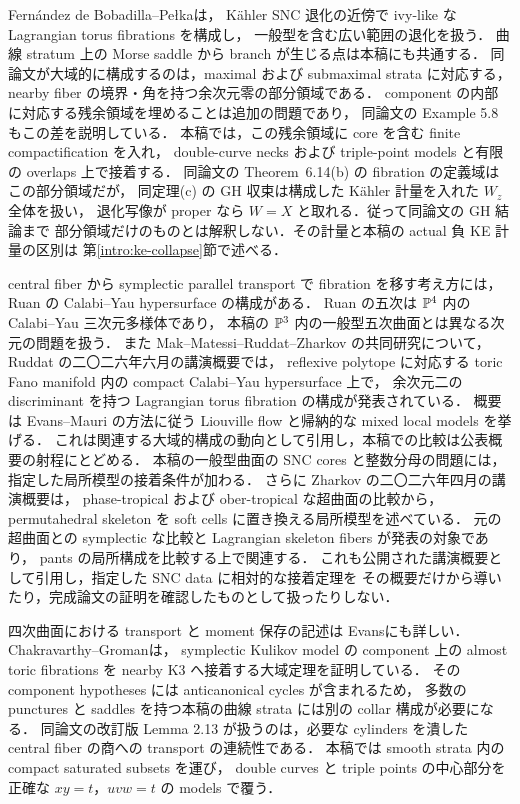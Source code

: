 Fernández de Bobadilla--Pełka\cite[Proposition 5.6, Theorem 6.14]{FBP}は，
Kähler SNC 退化の近傍で ivy-like な Lagrangian torus fibrations を構成し，
一般型を含む広い範囲の退化を扱う．
曲線 stratum 上の Morse saddle から branch が生じる点は本稿にも共通する．
同論文が大域的に構成するのは，maximal および submaximal strata に対応する，
nearby fiber の境界・角を持つ余次元零の部分領域である．
component の内部に対応する残余領域を埋めることは追加の問題であり，
同論文の Example 5.8 もこの差を説明している．
本稿では，この残余領域に core を含む finite compactification を入れ，
double-curve necks および triple-point models と有限の overlaps 上で接着する．
同論文の Theorem~6.14(b) の fibration の定義域はこの部分領域だが，
同定理(c) の GH 収束は構成した Kähler 計量を入れた $W_z$ 全体を扱い，
退化写像が proper なら $W=X$ と取れる．従って同論文の GH 結論まで
部分領域だけのものとは解釈しない．その計量と本稿の actual 負 KE 計量の区別は
第\ref{intro:ke-collapse}節で述べる．

central fiber から symplectic parallel transport で fibration を移す考え方には，
Ruan の Calabi--Yau hypersurface の構成\cite{Ruan}がある．
Ruan の五次は $\mathbb P^4$ 内の Calabi--Yau 三次元多様体であり，
本稿の $\mathbb P^3$ 内の一般型五次曲面とは異なる次元の問題を扱う．
また Mak--Matessi--Ruddat--Zharkov の共同研究について，
Ruddat の二〇二六年六月の講演概要\cite{RuddatAnnouncement2026}では，
reflexive polytope に対応する toric Fano manifold 内の compact Calabi--Yau hypersurface 上で，
余次元二の discriminant を持つ Lagrangian torus fibration の構成が発表されている．
概要は Evans--Mauri の方法に従う Liouville flow と帰納的な mixed local models を挙げる．
これは関連する大域的構成の動向として引用し，本稿での比較は公表概要の射程にとどめる．
本稿の一般型曲面の SNC cores と整数分母の問題には，指定した局所模型の接着条件が加わる．
さらに Zharkov の二〇二六年四月の講演概要\cite{ZharkovSoftCells2026}は，
phase-tropical および ober-tropical な超曲面の比較から，
permutahedral skeleton を soft cells に置き換える局所模型を述べている．
元の超曲面との symplectic な比較と Lagrangian skeleton fibers が発表の対象であり，
pants の局所構成を比較する上で関連する．
これも公開された講演概要として引用し，指定した SNC data に相対的な接着定理を
その概要だけから導いたり，完成論文の証明を確認したものとして扱ったりしない．

四次曲面における transport と moment 保存の記述は
Evans\cite[Chapter 6]{EvansNotes}にも詳しい．
Chakravarthy--Groman\cite[Theorem 1.6]{CGK3}は，
symplectic Kulikov model の component 上の almost toric fibrations を
nearby K3 へ接着する大域定理を証明している．
その component hypotheses には anticanonical cycles が含まれるため，
多数の punctures と saddles を持つ本稿の曲線 strata には別の collar 構成が必要になる．
同論文の改訂版 Lemma 2.13 が扱うのは，必要な cylinders を潰した
central fiber の商への transport の連続性である．
本稿では smooth strata 内の compact saturated subsets を運び，
double curves と triple points の中心部分を正確な $xy=t$，$uvw=t$ の models で覆う．

